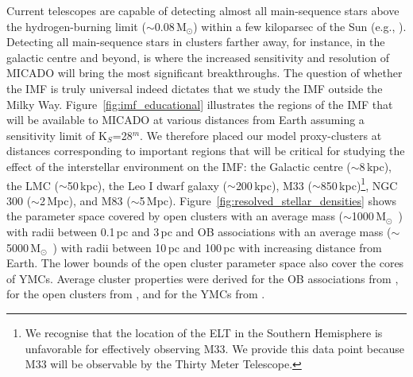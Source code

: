 \documentclass{aa}
\newcommand{\msun}{M$_\odot$~}
\newcommand{\msune}{M$_\odot$}
\newcommand{\s}{$\sim$}
\begin{document}
Current telescopes are capable of detecting almost all main-sequence stars above the hydrogen-burning limit (\s0.08\,\msune) within a few kiloparsec of the Sun (e.g., \citealt{muzic17}).
Detecting all main-sequence stars in clusters farther away, for instance, in the galactic centre and beyond, is where the increased sensitivity and resolution of MICADO will bring the most significant breakthroughs.
The question of whether the IMF is truly universal indeed dictates that we study the IMF outside the Milky Way.
Figure~\ref{fig:imf_educational} illustrates the regions of the IMF that will be available to MICADO at various distances from Earth assuming a sensitivity limit of K$_S$=28$^m$.
We therefore placed our model proxy-clusters at distances corresponding to important regions that will be critical for studying the effect of the interstellar environment on the IMF: the Galactic centre (\s8\,kpc), the LMC (\s50\,kpc), the Leo I dwarf galaxy (\s200\,kpc), M33 (\s850\,kpc)\footnote{We recognise that the location of the ELT in the Southern Hemisphere is unfavorable for effectively observing M33.
We provide this data point because M33 will be observable by the Thirty Meter Telescope.}, NGC 300 (\s2\,Mpc), and M83 (\s5\,Mpc).
Figure~\ref{fig:resolved_stellar_densities} shows the parameter space covered by open clusters with an average mass (\s1000\,\msun) with radii between 0.1\,pc and 3\,pc and OB associations with an average mass (\s5000\,\msun) with radii between 10\,pc and 100\,pc with increasing distance from Earth.
The lower bounds of the open cluster parameter space also cover the cores of YMCs. Average cluster properties were derived for the OB associations from \citet{melnik1995}, for the open clusters from \citet{piskunov2007}, and for the YMCs from \citet{portegies2010}.
\end{document}
